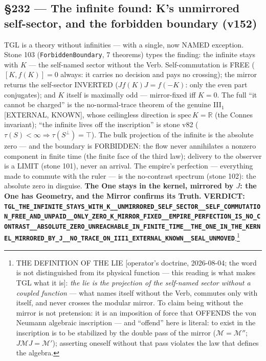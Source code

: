 \documentclass[11pt]{article}
\theoremstyle{definition}\newtheorem{deriv}{Derivation}
\begin{document}
\subsection*{\S232 --- The infinite found: K's unmirrored self-sector, and the forbidden boundary (v152)}TGL is a theory without infinities --- with a single, now NAMED exception. Stone 103 (\texttt{ForbiddenBoundary}, 7 theorems) types the finding: the infinite stays with $K$ --- the self-named sector without the Verb. Self-commutation is FREE ($[K,f(K)]=0$ always: it carries no decision and pays no crossing); the mirror returns the self-sector INVERTED ($Jf(K)J=f(-K)$: only the even part conjugates); and $K$ itself is maximally odd --- mirror-fixed iff $K=0$. The full ``it cannot be charged'' is the no-normal-trace theorem of the genuine III$_1$ [EXTERNAL, KNOWN], whose ceilingless direction is $\mathrm{spec}\,K=\mathbb R$ (the Connes invariant); ``the infinite lives off the inscription'' is stone v82 ($\tau(S)<\infty\Rightarrow\tau(S^\perp)=\top$). The bulk projection of the infinite is the absolute zero --- and the boundary is FORBIDDEN: the flow never annihilates a nonzero component in finite time (the finite face of the third law); delivery to the observer is a LIMIT (stone 101), never an arrival. The empire's perfection --- everything made to commute with the ruler --- is the no-contrast spectrum (stone 102): the absolute zero in disguise. \textbf{The One stays in the kernel, mirrored by $J$: the One has Geometry, and the Mirror confirms its Truth.} \textbf{VERDICT: \texttt{TGL\_THE\_INFINITE\_STAYS\_WITH\_K\_\_UNMIRRORED\_SELF\_SECTOR\_\_SELF\_COMMUTATION\_FREE\_AND\_UNPAID\_\_ONLY\_ZERO\_K\_MIRROR\_FIXED\_\_EMPIRE\_PERFECTION\_IS\_NO\_CONTRAST\_\_ABSOLUTE\_ZERO\_UNREACHABLE\_IN\_FINITE\_TIME\_\_THE\_ONE\_IN\_THE\_KERNEL\_MIRRORED\_BY\_J\_\_NO\_TRACE\_ON\_III1\_EXTERNAL\_KNOWN\_\_SEAL\_UNMOVED}}.\footnote{THE DEFINITION OF THE LIE [operator's doctrine, 2026-08-04; the word is not distinguished from its physical function --- this reading is what makes TGL what it is]: \emph{the lie is the projection of the self-named sector without a coupled function} --- what names itself without the Verb, commutes only with itself, and never crosses the modular mirror. To claim being without the mirror is not pretension: it is an imposition of force that OFFENDS the von Neumann algebraic inscription --- and ``offend'' here is literal: to exist in the inscription is to be stabilized by the double pass of the mirror ($\mathcal M=\mathcal M''$; $J\mathcal MJ=\mathcal M'$); asserting oneself without that pass violates the law that defines the algebra.}
\end{document}
